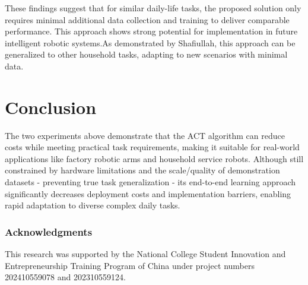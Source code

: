 \documentclass[runningheads]{llncs}
\begin{document}
These findings suggest that for similar daily-life tasks, the proposed solution only requires minimal additional data collection and training to deliver comparable performance. This approach shows strong potential for implementation in future intelligent robotic systems.As demonstrated by Shafiullah\cite{ref17}, this approach can be generalized to other household tasks, adapting to new scenarios with minimal data.


\section{Conclusion}
The two experiments above demonstrate that the ACT algorithm can reduce costs while meeting practical task requirements, making it suitable for real-world applications like factory robotic arms and household service robots. Although still constrained by hardware limitations and the scale/quality of demonstration datasets - preventing true task generalization - its end-to-end learning approach significantly decreases deployment costs and implementation barriers, enabling rapid adaptation to diverse complex daily tasks.

\subsubsection{Acknowledgments} This research was supported by the National College Student Innovation and Entrepreneurship Training Program of China under project numbers 202410559078 and 202310559124.





\end{document}

